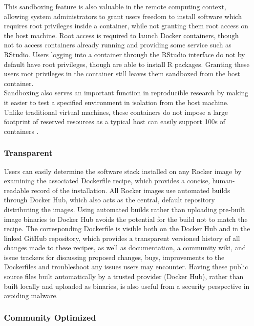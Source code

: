 This sandboxing feature is also valuable in the remote computing
context, allowing system administrators to grant users freedom to
install software which requires root privileges inside a container,
while not granting them root access on the host machine. Root access is
required to launch Docker containers, though not to access containers
already running and providing some service such as RStudio. Users
logging into a container through the
RStudio\textsuperscript{\textregistered} interface do not by default
have root privileges, though are able to install R packages. Granting
these users root privileges in the container still leaves them sandboxed
from the host container.\\
Sandboxing also serves an important function in reproducible research by
making it easier to test a specified environment in isolation from the
host machine. Unlike traditional virtual machines, these containers do
not impose a large footprint of reserved resources as a typical host can
easily support 100s of containers \citep{what-docker}.

\subsubsection{Transparent}\label{transparent}

Users can easily determine the software stack installed on any Rocker
image by examining the associated Dockerfile recipe, which provides a
concise, human-readable record of the installation. All Rocker images
use automated builds through Docker Hub, which also acts as the central,
default repository distributing the images. Using automated builds
rather than uploading pre-built image binaries to Docker Hub avoids the
potential for the build not to match the recipe. The corresponding
Dockerfile is visible both on the Docker Hub and in the linked GitHub
repository, which provides a transparent versioned history of all
changes made to these recipes, as well as documentation, a community
wiki, and issue trackers for discussing proposed changes, bugs,
improvements to the Dockerfiles and troubleshoot any issues users may
encounter. Having these public source files built automatically by a
trusted provider (Docker Hub), rather than built locally and uploaded as
binaries, is also useful from a security perspective in avoiding
malware.

\subsubsection{Community Optimized}\label{community-optimized}


